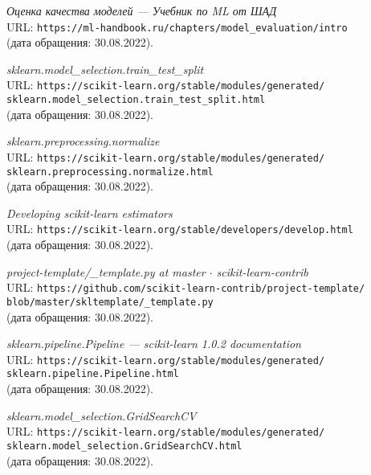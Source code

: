 \begin{thebibliography}{99}    
{\itshape Оценка качества моделей --- Учебник по ML от ШАД}\\
URL: \texttt{https://ml-handbook.ru/chapters/model\_evaluation/intro}\\
(дата обращения: 30.08.2022).

{\itshape sklearn.model\_selection.train\_test\_split}\\
URL: \texttt{https://scikit-learn.org/stable/modules/generated/\\sklearn.model\_selection.train\_test\_split.html}\\
(дата обращения: 30.08.2022).

{\itshape sklearn.preprocessing.normalize}\\
URL: \texttt{https://scikit-learn.org/stable/modules/generated/\\sklearn.preprocessing.normalize.html}\\
(дата обращения: 30.08.2022).

{\itshape Developing scikit-learn estimators}\\
URL: \texttt{https://scikit-learn.org/stable/developers/develop.html}\\
(дата обращения: 30.08.2022).

{\itshape project-template/\_template.py at master $\cdot$ scikit-learn-contrib}\\
URL: \texttt{https://github.com/scikit-learn-contrib/project-template/\\blob/master/skltemplate/\_template.py}\\
(дата обращения: 30.08.2022).

{\itshape sklearn.pipeline.Pipeline --- scikit-learn 1.0.2 documentation}\\
URL: \texttt{https://scikit-learn.org/stable/modules/generated/\\sklearn.pipeline.Pipeline.html}\\
(дата обращения: 30.08.2022).

{\itshape sklearn.model\_selection.GridSearchCV}\\
URL: \texttt{https://scikit-learn.org/stable/modules/generated/\\sklearn.model\_selection.GridSearchCV.html}\\
(дата обращения: 30.08.2022).


\end{thebibliography}
